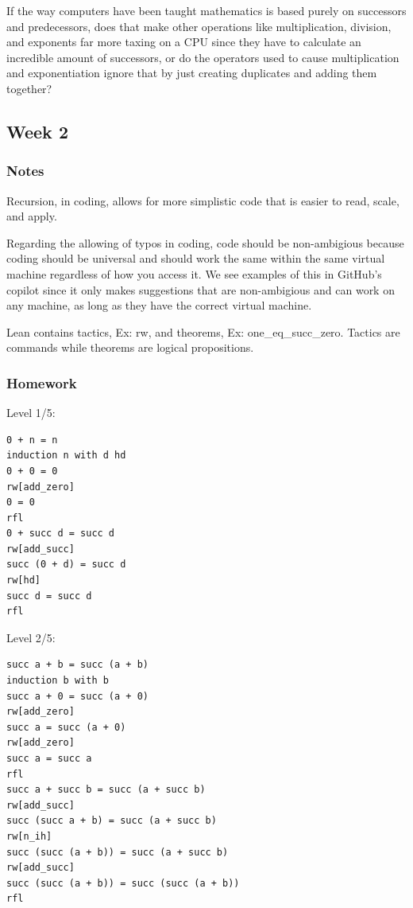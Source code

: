 \documentclass{article}
\theoremstyle{theorem}
\theoremstyle{definition}
\theoremstyle{remark}
\begin{document}
If the way computers have been taught mathematics is based purely on successors and predecessors, does that make other operations like multiplication, division, and exponents far more taxing on a CPU since they have to calculate an incredible amount of successors, or do the operators used to cause multiplication and exponentiation ignore that by just creating duplicates and adding them together?


\subsection{Week 2}

\subsubsection*{Notes}

Recursion, in coding, allows for more simplistic code that is easier to read, scale, and apply. 

Regarding the allowing of typos in coding, code should be non-ambigious because coding should be universal and should work the same within the same virtual machine regardless of how you access it. We see examples of this in GitHub's copilot since it only makes suggestions that are non-ambigious and can work on any machine, as long as they have the correct virtual machine.

Lean contains tactics, Ex: rw, and theorems, Ex: one\_eq\_succ\_zero. Tactics are commands while theorems are logical propositions.

\subsubsection*{Homework}
Level 1/5:
\begin{lstlisting}
0 + n = n
induction n with d hd
0 + 0 = 0
rw[add_zero]
0 = 0
rfl
0 + succ d = succ d
rw[add_succ]
succ (0 + d) = succ d
rw[hd]
succ d = succ d
rfl
\end{lstlisting}

Level 2/5:
\begin{lstlisting}
succ a + b = succ (a + b)
induction b with b
succ a + 0 = succ (a + 0)
rw[add_zero]
succ a = succ (a + 0)
rw[add_zero]
succ a = succ a
rfl
succ a + succ b = succ (a + succ b)
rw[add_succ]
succ (succ a + b) = succ (a + succ b)
rw[n_ih]
succ (succ (a + b)) = succ (a + succ b)
rw[add_succ]
succ (succ (a + b)) = succ (succ (a + b))
rfl
\end{lstlisting}
\end{document}
